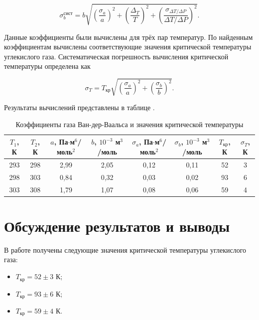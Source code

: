 \documentclass[a4paper,12pt]{article} %
\begin{document}
\begin{equation}
    \sigma_b^\text{сист} = b \sqrt{(\frac{\sigma_a}{a})^2 + (\frac{\Delta_T}{T})^2 + (\frac{\sigma_{\Delta T/\Delta P}}{\Delta T/\Delta P})^2}.
\end{equation}

Данные коэффициенты были вычислены для трёх пар температур. По найденным коэффициентам вычислены соответствующие значения критической температуры углекислого газа. Систематическая погрешность вычисления критической температуры определена как

\begin{equation}
    \sigma_T = T_\text{кр} \sqrt{(\frac{\sigma_a}{a})^2 + (\frac{\sigma_b}{b})^2}.
\end{equation}

Результаты вычислений представлены в таблице .

\begin{table}[]
    \centering
    \begin{tabular}{|c|c|c|c|c|c|c|c|}\hline
        $T_1$, К & $T_2$, К & $a$, Па$\cdot$м$^6$/моль$^2$ & $b$, $10^{-3}$ м$^3$/моль & $\sigma_a$, Па$\cdot$м$^6$/моль$^2$ & $\sigma_b$, $10^{-3}$ м$^3$/моль & $T_\text{кр}$, К & $\sigma_T$, К \\ \hline
        293 & 298 & 2,99 & 2,05 & 0,12 & 0,11 & 52 & 3 \\ \hline
        298 & 303 & 0,84 & 0,32 & 0,03 & 0,02 & 93 & 6 \\ \hline
        303 & 308 & 1,79 & 1,07 & 0,08 & 0,06 & 59 & 4 \\ \hline
        \end{tabular}
    \caption{Коэффициенты газа Ван-дер-Ваальса и значения критической температуры}
    \label{tab:badResults}
\end{table}

\section{Обсуждение результатов и выводы}

В работе получены следующие значения критической температуры углекислого газа:

\begin{itemize}
    \item $T_\text{кр} = 52 \pm 3$ К;
    \item $T_\text{кр} = 93 \pm 6$ К;
    \item $T_\text{кр} = 59 \pm 4$ К.
\end{itemize}
\end{document}
